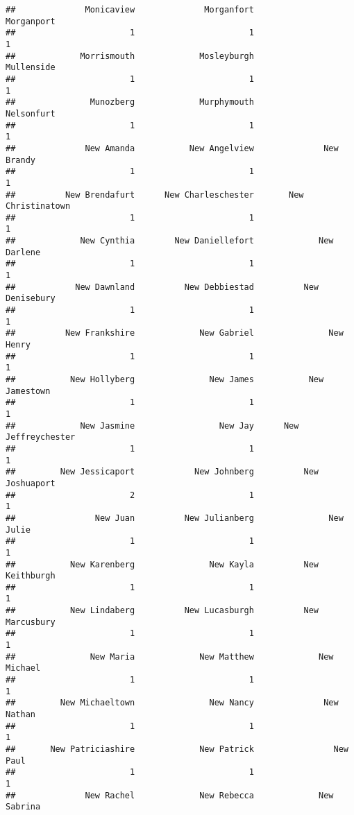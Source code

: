 \documentclass[
]{article}
\begin{document}
\begin{verbatim}
##              Monicaview              Morganfort              Morganport 
##                       1                       1                       1 
##             Morrismouth             Mosleyburgh              Mullenside 
##                       1                       1                       1 
##               Munozberg             Murphymouth              Nelsonfurt 
##                       1                       1                       1 
##              New Amanda           New Angelview              New Brandy 
##                       1                       1                       1 
##          New Brendafurt      New Charleschester       New Christinatown 
##                       1                       1                       1 
##             New Cynthia        New Daniellefort             New Darlene 
##                       1                       1                       1 
##            New Dawnland          New Debbiestad          New Denisebury 
##                       1                       1                       1 
##          New Frankshire             New Gabriel               New Henry 
##                       1                       1                       1 
##           New Hollyberg               New James           New Jamestown 
##                       1                       1                       1 
##             New Jasmine                 New Jay      New Jeffreychester 
##                       1                       1                       1 
##         New Jessicaport            New Johnberg          New Joshuaport 
##                       2                       1                       1 
##                New Juan          New Julianberg               New Julie 
##                       1                       1                       1 
##           New Karenberg               New Kayla          New Keithburgh 
##                       1                       1                       1 
##           New Lindaberg          New Lucasburgh          New Marcusbury 
##                       1                       1                       1 
##               New Maria             New Matthew             New Michael 
##                       1                       1                       1 
##         New Michaeltown               New Nancy              New Nathan 
##                       1                       1                       1 
##       New Patriciashire             New Patrick                New Paul 
##                       1                       1                       1 
##              New Rachel             New Rebecca             New Sabrina 

\end{verbatim}
\end{document}
